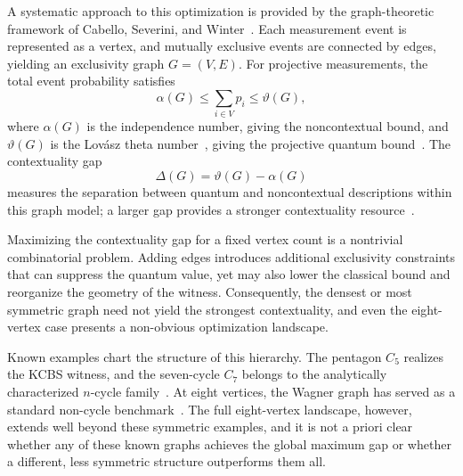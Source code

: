 \documentclass[aps,pra,twocolumn,superscriptaddress,longbibliography,floatfix]{revtex4-2}
\newcommand{\vt}{\vartheta}
\newcommand{\al}{\alpha}
\newcommand{\De}{\Delta}
\begin{document}
A systematic approach to this optimization is provided by the graph-theoretic
framework of Cabello, Severini, and Winter~\cite{Cabello2014}. Each
measurement event is represented as a vertex, and mutually exclusive events
are connected by edges, yielding an exclusivity graph $G=(V,E)$. For
projective measurements, the total event probability satisfies
\begin{equation}
  \al(G) \leq \sum_{i\in V}p_i \leq \vt(G),
  \label{eq:csw_intro}
\end{equation}
where $\al(G)$ is the independence number, giving the noncontextual bound,
and $\vt(G)$ is the Lov\'{a}sz theta number~\cite{Lovasz1979}, giving the
projective quantum bound~\cite{Cabello2014}. The contextuality gap
\begin{equation}
  \De(G) = \vt(G) - \al(G)
  \label{eq:gap_intro}
\end{equation}
measures the separation between quantum and noncontextual descriptions within
this graph model; a larger gap provides a stronger contextuality
resource~\cite{Budroni2022}.

Maximizing the contextuality gap for a fixed vertex count is a nontrivial
combinatorial problem. Adding edges introduces additional exclusivity
constraints that can suppress the quantum value, yet may also lower the
classical bound and reorganize the geometry of the witness.
Consequently, the densest or most symmetric graph need not yield the
strongest contextuality, and even the eight-vertex case presents a
non-obvious optimization landscape.

Known examples chart the structure of this hierarchy. The pentagon $C_5$
realizes the KCBS witness, and the seven-cycle $C_7$ belongs to the
analytically characterized $n$-cycle family~\cite{Araujo2013}. At eight
vertices, the Wagner graph has served as a standard non-cycle
benchmark~\cite{Cabello2014,Lovasz1979}. The full eight-vertex landscape,
however, extends well beyond these symmetric examples, and it is not a priori
clear whether any of these known graphs achieves the global maximum gap or
whether a different, less symmetric structure outperforms them all.
\end{document}
